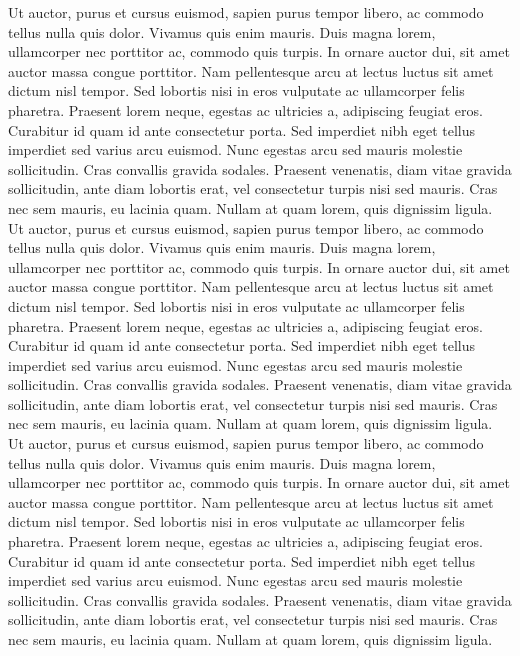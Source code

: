 Ut auctor, purus et cursus euismod, sapien purus tempor libero, ac commodo tellus nulla quis dolor. Vivamus quis enim mauris. Duis magna lorem, ullamcorper nec porttitor ac, commodo quis turpis. In ornare auctor dui, sit amet auctor massa congue porttitor. Nam pellentesque arcu at lectus luctus sit amet dictum nisl tempor. Sed lobortis nisi in eros vulputate ac ullamcorper felis pharetra. Praesent lorem neque, egestas ac ultricies a, adipiscing feugiat eros. Curabitur id quam id ante consectetur porta. Sed imperdiet nibh eget tellus imperdiet sed varius arcu euismod. Nunc egestas arcu sed mauris molestie sollicitudin. Cras convallis gravida sodales. Praesent venenatis, diam vitae gravida sollicitudin, ante diam lobortis erat, vel consectetur turpis nisi sed mauris. Cras nec sem mauris, eu lacinia quam. Nullam at quam lorem, quis dignissim ligula.
Ut auctor, purus et cursus euismod, sapien purus tempor libero, ac commodo tellus nulla quis dolor. Vivamus quis enim mauris. Duis magna lorem, ullamcorper nec porttitor ac, commodo quis turpis. In ornare auctor dui, sit amet auctor massa congue porttitor. Nam pellentesque arcu at lectus luctus sit amet dictum nisl tempor. Sed lobortis nisi in eros vulputate ac ullamcorper felis pharetra. Praesent lorem neque, egestas ac ultricies a, adipiscing feugiat eros. Curabitur id quam id ante consectetur porta. Sed imperdiet nibh eget tellus imperdiet sed varius arcu euismod. Nunc egestas arcu sed mauris molestie sollicitudin. Cras convallis gravida sodales. Praesent venenatis, diam vitae gravida sollicitudin, ante diam lobortis erat, vel consectetur turpis nisi sed mauris. Cras nec sem mauris, eu lacinia quam. Nullam at quam lorem, quis dignissim ligula.
Ut auctor, purus et cursus euismod, sapien purus tempor libero, ac commodo tellus nulla quis dolor. Vivamus quis enim mauris. Duis magna lorem, ullamcorper nec porttitor ac, commodo quis turpis. In ornare auctor dui, sit amet auctor massa congue porttitor. Nam pellentesque arcu at lectus luctus sit amet dictum nisl tempor. Sed lobortis nisi in eros vulputate ac ullamcorper felis pharetra. Praesent lorem neque, egestas ac ultricies a, adipiscing feugiat eros. Curabitur id quam id ante consectetur porta. Sed imperdiet nibh eget tellus imperdiet sed varius arcu euismod. Nunc egestas arcu sed mauris molestie sollicitudin. Cras convallis gravida sodales. Praesent venenatis, diam vitae gravida sollicitudin, ante diam lobortis erat, vel consectetur turpis nisi sed mauris. Cras nec sem mauris, eu lacinia quam. Nullam at quam lorem, quis dignissim ligula. 

